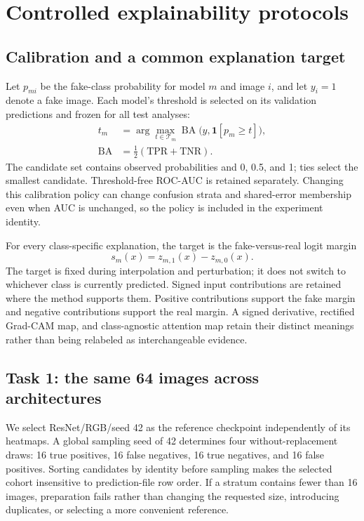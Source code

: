\documentclass[conference,10pt,letterpaper]{IEEEtran}
\newcommand{\BA}{\operatorname{BA}}
\newcommand{\ind}{\mathbf{1}}
\begin{document}
\section{Controlled explainability protocols}
\subsection{Calibration and a common explanation target}
Let $p_{mi}$ be the fake-class probability for model $m$ and image $i$, and let $y_i=1$ denote a fake image. Each model's threshold is selected on its validation predictions and frozen for all test analyses:
\begin{equation}
\begin{aligned}
 t_m&=\arg\max_{t\in\mathcal T_m}\BA\bigl(y,\ind[p_m\geq t]\bigr),\\
 \BA&=\tfrac12(\mathrm{TPR}+\mathrm{TNR}).
\end{aligned}
\end{equation}
The candidate set contains observed probabilities and 0, 0.5, and 1; ties select the smallest candidate. Threshold-free ROC-AUC is retained separately. Changing this calibration policy can change confusion strata and shared-error membership even when AUC is unchanged, so the policy is included in the experiment identity.

For every class-specific explanation, the target is the fake-versus-real logit margin
\begin{equation}
 s_m(x)=z_{m,1}(x)-z_{m,0}(x).
\end{equation}
The target is fixed during interpolation and perturbation; it does not switch to whichever class is currently predicted. Signed input contributions are retained where the method supports them. Positive contributions support the fake margin and negative contributions support the real margin. A signed derivative, rectified Grad-CAM map, and class-agnostic attention map retain their distinct meanings rather than being relabeled as interchangeable evidence.

\subsection{Task 1: the same 64 images across architectures}
We select ResNet/RGB/seed 42 as the reference checkpoint independently of its heatmaps. A global sampling seed of 42 determines four without-replacement draws: 16 true positives, 16 false negatives, 16 true negatives, and 16 false positives. Sorting candidates by identity before sampling makes the selected cohort insensitive to prediction-file row order. If a stratum contains fewer than 16 images, preparation fails rather than changing the requested size, introducing duplicates, or selecting a more convenient reference.
\end{document}
